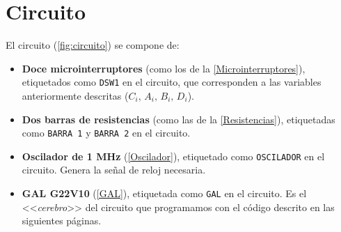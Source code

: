 \section*{Circuito}
El circuito (\cref{fig:circuito}) se compone de:
\begin{itemize}
    \item \textbf{Doce microinterruptores} (como los de la \cref{Microinterruptores}), etiquetados como \texttt{DSW1} en el circuito, que corresponden a las variables anteriormente descritas ($C_i, \, A_i, \, B_i,\, D_i$). 
    \item \textbf{Dos  barras de resistencias} (como las de la \cref{Resistencias}), etiquetadas como \texttt{BARRA 1} y \texttt{BARRA 2} en el circuito.
    \item \textbf{Oscilador de 1 MHz} (\cref{Oscilador}), etiquetado como \texttt{OSCILADOR} en el circuito. Genera la señal de reloj necesaria.
    \item \textbf{GAL G22V10} (\cref{GAL}), etiquetada como \texttt{GAL} en el circuito. Es el <<\textit{cerebro}>> del circuito que programamos con el código descrito en las siguientes páginas.
\end{itemize}


